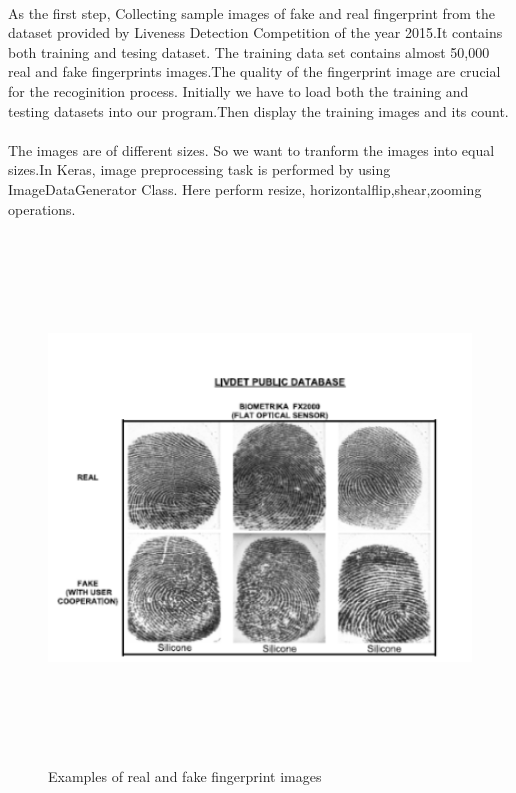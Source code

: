 \documentclass[a4paper,12pt,oneside]{article}
\begin{document}
\paragraph{}
As the first step, Collecting sample images of fake and real fingerprint from the dataset provided by Liveness Detection Competition of the year 2015.It contains both training and tesing dataset. The training data set contains almost 50,000 real and fake fingerprints images.The quality of the fingerprint image are crucial for the recoginition process.
Initially we have to load both the training and testing datasets into our program.Then display the training images and its count.
\paragraph{}
The images are of different sizes. So we want to tranform the images into equal sizes.In Keras, image preprocessing task is performed by using ImageDataGenerator Class. Here perform resize, 
horizontalflip,shear,zooming operations.





\begin{figure}[H]
\centering
\includegraphics[height=14cm,width=15cm]{dataset.PNG}
\caption{Examples of real and fake fingerprint images} 
\end{figure}
\end{document}
